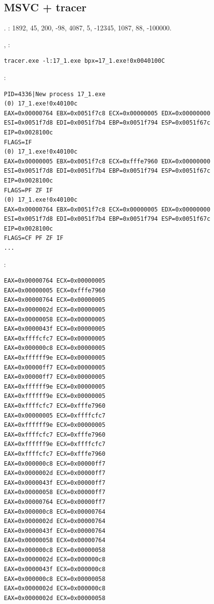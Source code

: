 \subsection{MSVC + tracer}

.
: 
1892, 45, 200, -98, 4087, 5, -12345, 1087, 88, -100000.

 \CMP 
{} \comp,   
:

\begin{lstlisting}
tracer.exe -l:17_1.exe bpx=17_1.exe!0x0040100C
\end{lstlisting}

:

\begin{lstlisting}
PID=4336|New process 17_1.exe
(0) 17_1.exe!0x40100c
EAX=0x00000764 EBX=0x0051f7c8 ECX=0x00000005 EDX=0x00000000
ESI=0x0051f7d8 EDI=0x0051f7b4 EBP=0x0051f794 ESP=0x0051f67c
EIP=0x0028100c
FLAGS=IF
(0) 17_1.exe!0x40100c
EAX=0x00000005 EBX=0x0051f7c8 ECX=0xfffe7960 EDX=0x00000000
ESI=0x0051f7d8 EDI=0x0051f7b4 EBP=0x0051f794 ESP=0x0051f67c
EIP=0x0028100c
FLAGS=PF ZF IF
(0) 17_1.exe!0x40100c
EAX=0x00000764 EBX=0x0051f7c8 ECX=0x00000005 EDX=0x00000000
ESI=0x0051f7d8 EDI=0x0051f7b4 EBP=0x0051f794 ESP=0x0051f67c
EIP=0x0028100c
FLAGS=CF PF ZF IF
...
\end{lstlisting}

  \AndENRU {} :

\begin{lstlisting}
EAX=0x00000764 ECX=0x00000005
EAX=0x00000005 ECX=0xfffe7960
EAX=0x00000764 ECX=0x00000005
EAX=0x0000002d ECX=0x00000005
EAX=0x00000058 ECX=0x00000005
EAX=0x0000043f ECX=0x00000005
EAX=0xffffcfc7 ECX=0x00000005
EAX=0x000000c8 ECX=0x00000005
EAX=0xffffff9e ECX=0x00000005
EAX=0x00000ff7 ECX=0x00000005
EAX=0x00000ff7 ECX=0x00000005
EAX=0xffffff9e ECX=0x00000005
EAX=0xffffff9e ECX=0x00000005
EAX=0xffffcfc7 ECX=0xfffe7960
EAX=0x00000005 ECX=0xffffcfc7
EAX=0xffffff9e ECX=0x00000005
EAX=0xffffcfc7 ECX=0xfffe7960
EAX=0xffffff9e ECX=0xffffcfc7
EAX=0xffffcfc7 ECX=0xfffe7960
EAX=0x000000c8 ECX=0x00000ff7
EAX=0x0000002d ECX=0x00000ff7
EAX=0x0000043f ECX=0x00000ff7
EAX=0x00000058 ECX=0x00000ff7
EAX=0x00000764 ECX=0x00000ff7
EAX=0x000000c8 ECX=0x00000764
EAX=0x0000002d ECX=0x00000764
EAX=0x0000043f ECX=0x00000764
EAX=0x00000058 ECX=0x00000764
EAX=0x000000c8 ECX=0x00000058
EAX=0x0000002d ECX=0x000000c8
EAX=0x0000043f ECX=0x000000c8
EAX=0x000000c8 ECX=0x00000058
EAX=0x0000002d ECX=0x000000c8
EAX=0x0000002d ECX=0x00000058
\end{lstlisting}

